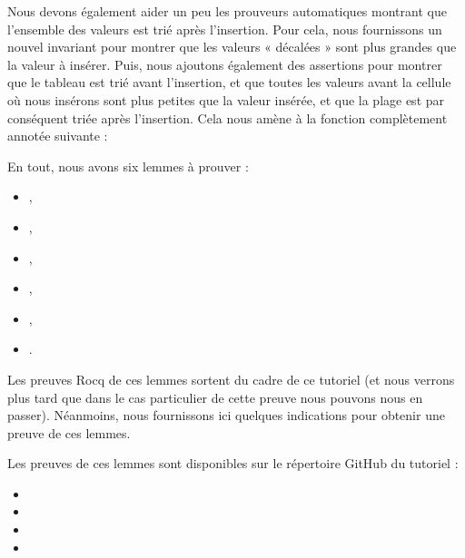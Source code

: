 Nous devons également aider un peu les prouveurs automatiques montrant
que l'ensemble des valeurs est trié après l'insertion. Pour cela, nous fournissons
un nouvel invariant pour montrer que les valeurs « décalées » sont plus grandes
que la valeur à insérer. Puis, nous ajoutons également des assertions pour
montrer que le tableau est trié avant l'insertion, et que toutes les valeurs
avant la cellule où nous insérons sont plus petites que la valeur insérée, et
que la plage est par conséquent triée après l'insertion. Cela nous amène à
la fonction  complètement annotée suivante :






En tout, nous avons six lemmes à prouver :
\begin{itemize}
\item {},
\item {},
\item {},
\item {},
\item {},
\item {}.
\end{itemize}


Les preuves Rocq de ces lemmes sortent du cadre de ce
tutoriel (et nous verrons plus tard que dans le cas particulier de cette preuve
nous pouvons nous en passer). Néanmoins, nous fournissons ici quelques
indications pour obtenir une preuve de ces lemmes.


\begin{Information}
  Les preuves de ces lemmes sont disponibles sur le répertoire GitHub du tutoriel :
  \begin{itemize}
    \item {}
    \item {}
    \item {}
    \item {}
  \end{itemize}
\end{Information}


